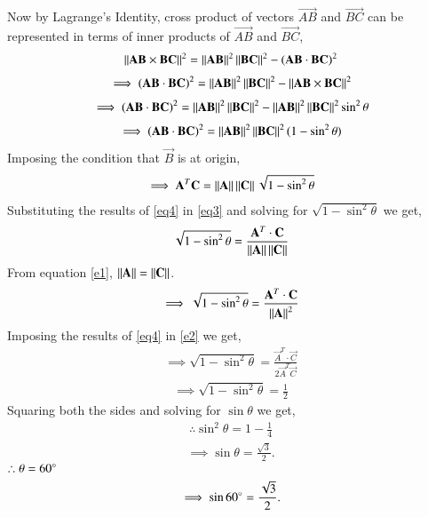 \documentclass[journal,12pt,twocolumn]{IEEEtran}
\begin{document}
Now by Lagrange's Identity, cross product of vectors $\vec{AB}$ and $\vec{BC}$ can be represented in terms of inner products of $\vec{AB}$ and $\vec{BC}$,
\begin{align}
\left\lVert\mathbf{AB}\times\mathbf{BC}\right\rVert^2 = \left\lVert\mathbf{AB}\right\rVert^2\left\lVert\mathbf{BC}\right\rVert^2-(\mathbf{AB}\cdot\mathbf{BC})^2
\end{align}
\begin{align}
\implies (\mathbf{AB}\cdot\mathbf{BC})^2 = \left\lVert\mathbf{AB}\right\rVert^2\left\lVert\mathbf{BC}\right\rVert^2 - \left\lVert\mathbf{AB}\times\mathbf{BC}\right\rVert^2 
\end{align}
\begin{align}
\implies (\mathbf{AB}\cdot\mathbf{BC})^2 = \left\lVert\mathbf{AB}\right\rVert^2\left\lVert\mathbf{BC}\right\rVert^2 - \left\lVert\mathbf{AB}\right\rVert^2\left\lVert\mathbf{BC}\right\rVert^2 \sin^2\theta
\end{align}
\begin{align}
\implies (\mathbf{AB}\cdot\mathbf{BC})^2 = \left\lVert\mathbf{AB}\right\rVert^2\left\lVert\mathbf{BC}\right\rVert^2 (1-\sin^2\theta)
\end{align}
Imposing the condition that $\vec{B}$ is at origin,
\begin{align}
\implies \mathbf{A}^T\mathbf{C} = \left\lVert\mathbf{A}\right\rVert\left\lVert\mathbf{C}\right\rVert \sqrt{1-\sin^2\theta}
\label{eq3}
\end{align}
Substituting the results of \eqref{eq4} in \eqref{eq3} and solving for $\sqrt{1-\sin^2\theta}$ we get,
\begin{align}
\sqrt{1-\sin^2\theta} = \frac{\mathbf{A}^T\cdot\mathbf{C}}{\left\lVert\mathbf{A}\right\rVert\left\lVert\mathbf{C}\right\rVert}
\end{align}
From equation \eqref{e1}, $\left\lVert\mathbf{A}\right\rVert = \left\lVert\mathbf{C}\right\rVert$.
\begin{align}
\implies \sqrt{1-\sin^2\theta} = \frac{\mathbf{A}^T\cdot\mathbf{C}}{\left\lVert\mathbf{A}\right\rVert^2}
\label{e2}
\end{align}
Imposing the results of \eqref{eq4} in \eqref{e2} we get,
\begin{align}
\implies \sqrt{1-\sin^2\theta} = \frac{\vec{A}^T\cdot\vec{C}}{2\vec{A}^T\vec{C}}
\end{align}
\begin{align}
\implies \sqrt{1-\sin^2\theta} = \frac{1}{2}
\end{align}
Squaring both the sides and solving for $\sin\theta$ we get,
\begin{align}
\therefore \sin^2\theta = 1-\frac{1}{4}
\end{align}
\begin{align}
\implies\sin\theta = \frac{\sqrt{3}}{2}.
\end{align}
$\therefore \theta = 60\degree$ 
\begin{align}
\implies \sin60\degree = \frac{\sqrt{3}}{2}.
\end{align}
\end{document}

